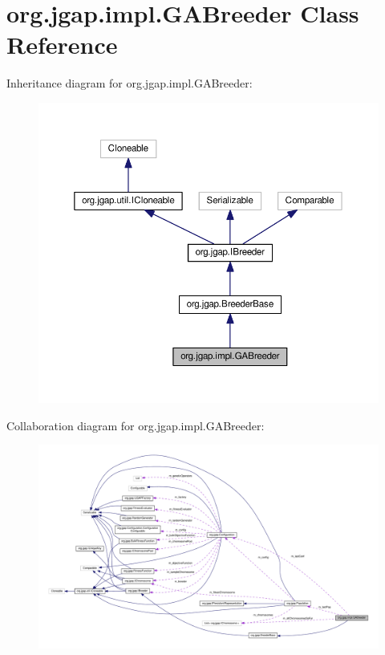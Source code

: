 \hypertarget{classorg_1_1jgap_1_1impl_1_1_g_a_breeder}{\section{org.\-jgap.\-impl.\-G\-A\-Breeder Class Reference}
\label{classorg_1_1jgap_1_1impl_1_1_g_a_breeder}
}


Inheritance diagram for org.\-jgap.\-impl.\-G\-A\-Breeder\-:
\nopagebreak
\begin{figure}[H]
\begin{center}
\leavevmode
\includegraphics[width=350pt]{classorg_1_1jgap_1_1impl_1_1_g_a_breeder__inherit__graph}
\end{center}
\end{figure}


Collaboration diagram for org.\-jgap.\-impl.\-G\-A\-Breeder\-:
\nopagebreak
\begin{figure}[H]
\begin{center}
\leavevmode
\includegraphics[width=350pt]{classorg_1_1jgap_1_1impl_1_1_g_a_breeder__coll__graph}
\end{center}
\end{figure}
